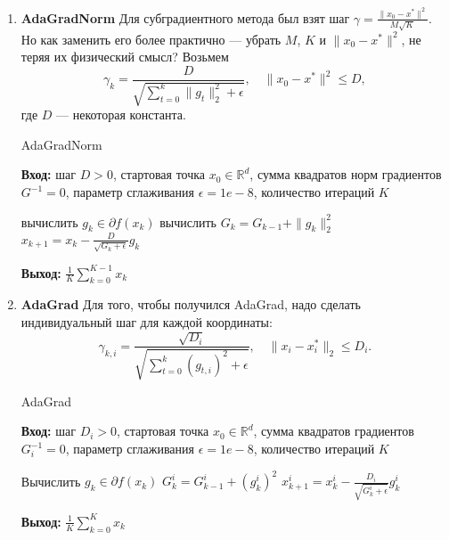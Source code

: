 \begin{enumerate}
    \item \textbf{AdaGradNorm}
          Для субградиентного метода был взят шаг $\gamma = \frac{\|x_0 - x^*\|^2}{M \sqrt{K}}$. Но как заменить его более практично — убрать $M$, $K$ и $\|x_0 - x^*\|^2$, не теряя их физический смысл? Возьмем
          $$ \gamma_k = \frac{D}{\sqrt{\sum_{t=0}^k \|g_t\|_2^2 + \epsilon}}, \quad \|x_0 - x^*\|^2 \leq D, $$
          где $D$ — некоторая константа.

          \begin{algorithm}[H]
              \caption{AdaGradNorm}
              \textbf{Вход:} шаг $D > 0$, стартовая точка $x_0 \in \mathbb{R}^d$, сумма квадратов норм градиентов $G^{-1} = 0$, параметр сглаживания $\epsilon = 1e-8$, количество итераций $K$
              \begin{algorithmic}[1]
                  \State вычислить $g_k \in \partial f(x_k)$
                  \State вычислить $G_k = G_{k-1} + \|g_k\|_2^2$
                  \State $x_{k+1} = x_k - \frac{D}{\sqrt{G_k + \epsilon}} g_k$
                  \EndFor
              \end{algorithmic}
              \textbf{Выход:} $\frac{1}{K} \sum_{k=0}^{K-1} x_k$
          \end{algorithm}

    \item \textbf{AdaGrad}
          Для того, чтобы получился AdaGrad, надо сделать индивидуальный шаг для каждой координаты:
          $$\gamma_{k,i} = \frac{\sqrt{D_i}}{\sqrt{\sum_{t=0}^{k} (g_{t,i})^2 + \epsilon}}, \quad \|x_i - x_i^*\|_2 \leq D_i.$$

          \begin{algorithm}[H]
              \caption{AdaGrad}
              \textbf{Вход:} шаг $D_i > 0$, стартовая точка $x_0 \in \mathbb{R}^d$, сумма квадратов градиентов $G_i^{-1} = 0$, параметр сглаживания $\epsilon = 1e-8$, количество итераций $K$
              \begin{algorithmic}[1]
                  \State Вычислить $g_k \in \partial f(x_k)$
                  \State $G_k^i = G_{k-1}^i + (g_k^i)^2$
                  \EndFor
                  \State $x_{k+1}^i = x_k^i - \frac{D_i}{\sqrt{G_k^i + \epsilon}} g_k^i$
                  \EndFor
                  \EndFor
              \end{algorithmic}
              \textbf{Выход:} $\frac{1}{K} \sum_{k=0}^K x_k$
          \end{algorithm}


\end{enumerate}

